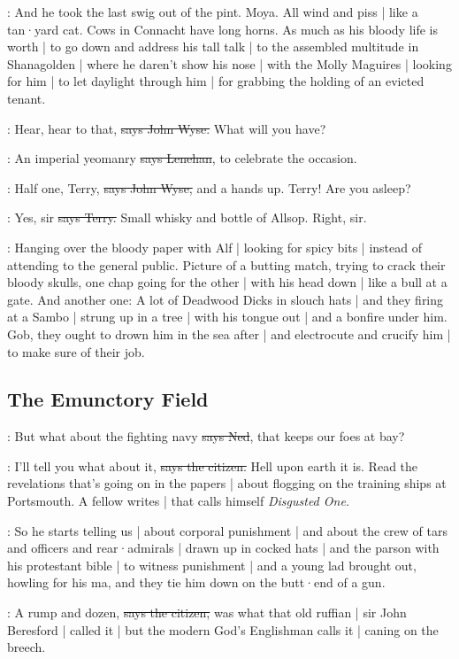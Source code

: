 \Nq:
And he took the last swig out of the pint.
Moya.
All wind and piss |
like a tan·yard cat.
Cows in Connacht have long horns.
As much as his bloody life is worth |
to go down and address his tall talk |
to the assembled multitude in Shanagolden |
where he daren't show his nose |
with the Molly Maguires |
looking for him |
to let daylight through him |
for grabbing the holding of an evicted tenant.

\johnwyse:
Hear,
hear to that,
\sout{says John Wyse.}
What will you have?

\lenehan:
An imperial yeomanry
\sout{says Lenehan},
to celebrate the occasion.

\johnwyse:
Half one,
Terry,
\sout{says John Wyse,}
and a hands up.
Terry!
Are you asleep?

\terry:
Yes,
sir
\sout{says Terry.}
Small whisky and bottle of Allsop.
Right,
sir.

\Nq:
Hanging over the bloody paper with Alf |
looking for spicy bits |
instead of attending to the general public.
Picture of a butting match,
trying to crack their bloody skulls,
one chap going for the other |
with his head down |
like a bull at a gate.
And another one:
A lot of Deadwood Dicks in slouch hats |
and they firing at a Sambo |
strung up in a tree |
with his tongue out |
and a bonfire under him.
Gob,
they ought to drown him in the sea after |
and electrocute and crucify him |
to make sure of their job.


\subsection*{The Emunctory Field}

\lambert:
But what about the fighting navy
\sout{says Ned},
that keeps our foes at bay?

\citizen:
I'll tell you what about it,
\sout{says the citizen.}
Hell upon earth it is.
Read the revelations that's going on in the papers |
about flogging on the training ships at Portsmouth.
A fellow writes |
that calls himself \emph{Disgusted One.}

\Nq:
So he starts telling us |
about corporal punishment |
and about the crew of tars and officers and rear·admirals |
drawn up in cocked hats |
and the parson with his protestant bible |
to witness punishment |
and a young lad brought out,
howling for his ma,
and they tie him down on the butt·end of a gun.

\citizen:
A rump and dozen,
\sout{says the citizen,}
was what that old ruffian |
sir John Beresford |
called it |
but the modern God's Englishman calls it |
caning on the breech.%

